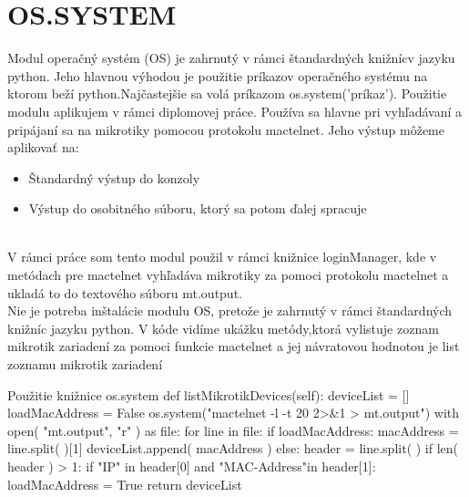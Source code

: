 \section{OS.SYSTEM}
Modul operačný systém (OS) \cite{OS} je zahrnutý v rámci štandardných knižnícv jazyku python. Jeho hlavnou výhodou je použitie príkazov operačného systému na ktorom beží python.Najčastejšie sa volá príkazom os.system('príkaz').
Použitie modulu aplikujem v rámci diplomovej práce. Používa sa hlavne pri vyhľadávaní a pripájaní sa na mikrotiky pomocou protokolu mactelnet. Jeho výstup môžeme aplikovať na:\begin{itemize}
\item Štandardný výstup do konzoly
\item Výstup do osobitného súboru, ktorý sa potom ďalej spracuje
\end{itemize}
\\
V rámci práce som tento modul použil v rámci knižnice loginManager, kde v metódach pre mactelnet vyhľadáva mikrotiky za pomoci protokolu mactelnet a ukladá to do textového súboru mt.output. \\
Nie je potreba inštalácie modulu  OS, pretože je zahrnutý v rámci štandardných knižníc jazyku python. V kóde vidíme ukážku metódy,ktorá vylistuje zoznam mikrotik zariadení za pomoci funkcie mactelnet a jej návratovou hodnotou je list zoznamu mikrotik zariadení
\\
\begin{sexylisting}{Použitie knižnice os.system}
def listMikrotikDevices(self):
 deviceList = []
 loadMacAddress = False
 os.system("mactelnet -l -t 20 2>&1 > mt.output")
 with open( "mt.output", "r" ) as file:
 for line in file:
  if loadMacAddress:
   macAddress = line.split( )[1]
   deviceList.append( macAddress )
  else:
   header = line.split( )
    if len( header ) > 1:
     if "IP" in header[0] and "MAC-Address"in header[1]:
      loadMacAddress = True
 return deviceList
\end{sexylisting}
